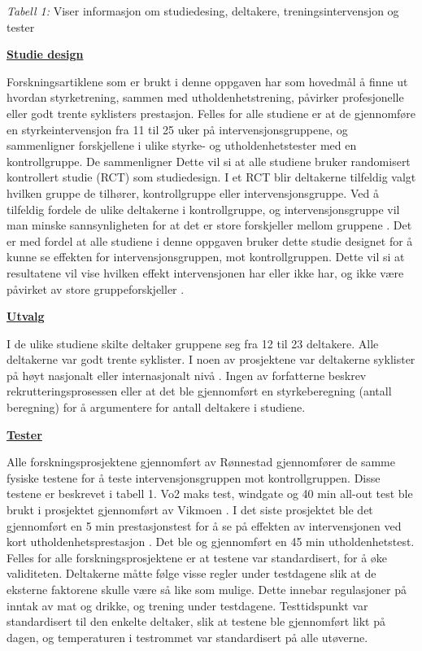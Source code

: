 \documentclass[
]{book}
\begin{document}
\emph{Tabell 1:} Viser informasjon om studiedesing, deltakere, treningsintervensjon og tester

\underline{\textbf{Studie design}}

Forskningsartiklene som er brukt i denne oppgaven har som hovedmål å finne ut hvordan styrketrening, sammen med utholdenhetstrening, påvirker profesjonelle eller godt trente syklisters prestasjon. Felles for alle studiene er at de gjennomføre en styrkeintervensjon fra 11 til 25 uker på intervensjonsgruppene, og sammenligner forskjellene i ulike styrke- og utholdenhetstester med en kontrollgruppe. De sammenligner Dette vil si at alle studiene bruker randomisert kontrollert studie (RCT) som studiedesign. I et RCT blir deltakerne tilfeldig valgt hvilken gruppe de tilhører, kontrollgruppe eller intervensjonsgruppe. Ved å tilfeldig fordele de ulike deltakerne i kontrollgruppe, og intervensjonsgruppe vil man minske sannsynligheten for at det er store forskjeller mellom gruppene \citep{hulley2013, Parab2010}. Det er med fordel at alle studiene i denne oppgaven bruker dette studie designet for å kunne se effekten for intervensjonsgruppen, mot kontrollgruppen. Dette vil si at resultatene vil vise hvilken effekt intervensjonen har eller ikke har, og ikke være påvirket av store gruppeforskjeller \citep{helsebiblioteket}.

\underline{\textbf{Utvalg}}

I de ulike studiene skilte deltaker gruppene seg fra 12 til 23 deltakere. Alle deltakerne var godt trente syklister. I noen av prosjektene var deltakerne syklister på høyt nasjonalt eller internasjonalt nivå \citep{rønnestad2010a, rønnestad2010b, rønnestad2015, aagaard2011}. Ingen av forfatterne beskrev rekrutteringsprosessen eller at det ble gjennomført en styrkeberegning (antall beregning) for å argumentere for antall deltakere i studiene.

\underline{\textbf{Tester}}

Alle forskningsprosjektene gjennomført av Rønnestad \citep{rønnestad2010a, rønnestad2010b, rønnestad2015} gjennomfører de samme fysiske testene for å teste intervensjonsgruppen mot kontrollgruppen. Disse testene er beskrevet i tabell 1. Vo2 maks test, windgate og 40 min all-out test ble brukt i prosjektet gjennomført av Vikmoen \citep{vikmoen2016}. I det siste prosjektet ble det gjennomført en 5 min prestasjonstest for å se på effekten av intervensjonen ved kort utholdenhetsprestasjon \citep{aagaard2011}. Det ble og gjennomført en 45 min utholdenhetstest. Felles for alle forskningsprosjektene er at testene var standardisert, for å øke validiteten. Deltakerne måtte følge visse regler under testdagene slik at de eksterne faktorene skulle være så like som mulige. Dette innebar regulasjoner på inntak av mat og drikke, og trening under testdagene. Testtidspunkt var standardisert til den enkelte deltaker, slik at testene ble gjennomført likt på dagen, og temperaturen i testrommet var standardisert på alle utøverne.
\end{document}
